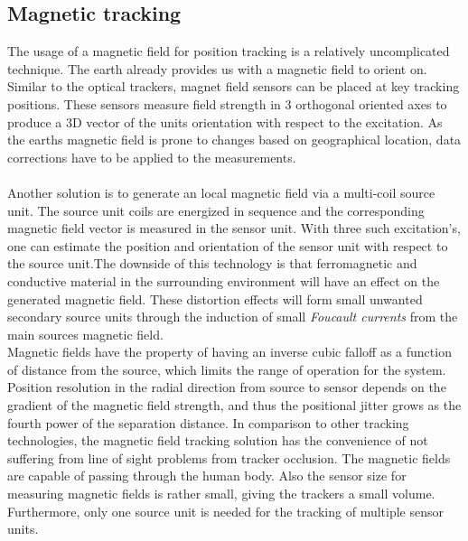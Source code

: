 \subsection{Magnetic tracking}
The usage of a magnetic field for position tracking is a relatively uncomplicated technique. The earth already provides us with a magnetic field to orient on. Similar to the optical trackers, magnet field sensors can be placed at key tracking positions. These sensors measure field strength in 3 orthogonal oriented axes to produce a 3D vector of the units orientation with respect to the excitation. As the earths magnetic field is prone to changes based on geographical location, data corrections have to be applied to the measurements.\\\\Another solution is to generate an local magnetic field via a multi-coil source unit. The source unit coils are energized in sequence and the corresponding magnetic field vector is measured in the sensor unit. With three such excitation's, one can estimate the position and orientation of the sensor unit with respect to the source unit.The downside of this technology is that ferromagnetic and conductive material in the surrounding environment will have an effect on the generated magnetic field. These distortion effects will form small unwanted secondary source units through the induction of small \textit{Foucault currents} from the main sources magnetic field.\\
Magnetic fields have the property of having an inverse cubic falloff  as a function of distance from the source, which limits the range of operation for the system.
Position resolution in the radial direction from source to sensor depends on the gradient of the magnetic field strength, and thus the positional jitter grows as the fourth power of the separation distance.
In comparison to other tracking technologies, the magnetic field tracking solution has the convenience of not suffering from line of sight problems from tracker occlusion. The magnetic fields are capable of passing through the human body. Also the sensor size for measuring magnetic fields is rather small, giving the trackers a small volume. Furthermore, only one source unit is needed for the tracking of multiple sensor units.
